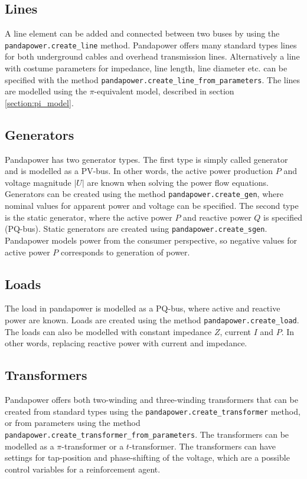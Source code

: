\documentclass[class=book, crop=false]{standalone}
\begin{document}
\subsection*{Lines}
A line element can be added and connected between two buses by using the \texttt{pandapower.create\_line} method. Pandapower offers many standard types lines for both underground cables and overhead transmission lines. Alternatively a line with costume parameters for impedance, line length, line diameter etc. can be specified with the method \texttt{pandapower.create\_line\_from\_parameters}. The lines are modelled using the $\pi$-equivalent model, described in section \ref{section:pi_model}.

\subsection*{Generators}
Pandapower has two generator types. The first type is simply called generator and is modelled as a PV-bus. In other words, the active power production $P$ and voltage magnitude $|U|$ are known when solving the power flow equations. Generators can be created using the method \texttt{pandapower.create\_gen}, where nominal values for apparent power and voltage can be specified. The second type is the static generator, where the active power $P$ and reactive power $Q$ is specified (PQ-bus). Static generators are created using \texttt{pandapower.create\_sgen}. Pandapower models power from the consumer perspective, so negative values for active power $P$ corresponds to generation of power.

\subsection*{Loads}
The load in pandapower is modelled as a PQ-bus, where active and reactive power are known. Loads are created using the method \texttt{pandapower.create\_load}. The loads can also be modelled with constant impedance $Z$, current $I$ and $P$. In other words, replacing reactive power with current and impedance.

\subsection*{Transformers}
Pandapower offers both two-winding and three-winding transformers that can be created from standard types using the \texttt{pandapower.create\_transformer} method, or from parameters using the method
\texttt{pandapower.create\_transformer\_from\_parameters}. The transformers can be modelled as a $\pi$-transformer or a $t$-transformer. The transformers can have settings for tap-position and phase-shifting of the voltage, which are a possible control variables for a reinforcement agent.  
\end{document}
